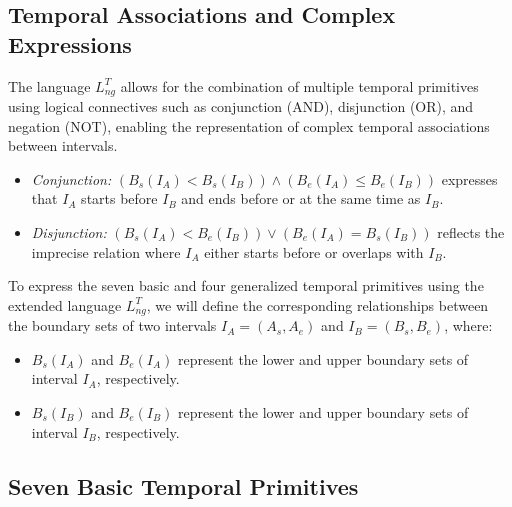 \subsection{Temporal Associations and Complex Expressions}\label{V-subsec:temporalassociations}

The language \( L_{ng}^T \) allows for the combination of multiple temporal primitives using logical connectives such as conjunction (AND), disjunction (OR), and negation (NOT), enabling the representation of complex temporal associations between intervals.

\begin{itemize}
    \item \textit{Conjunction:} \( (B_s(I_A) < B_s(I_B)) \land (B_e(I_A) \leq B_e(I_B)) \) expresses that \( I_A \) starts before \( I_B \) and ends before or at the same time as \( I_B \).
    \item \textit{Disjunction:} \( (B_s(I_A) < B_e(I_B)) \lor (B_e(I_A) = B_s(I_B)) \) reflects the imprecise relation where \( I_A \) either starts before or overlaps with \( I_B \).
\end{itemize}

To express the seven basic and four generalized temporal primitives using the extended language \( L_{ng}^T \), we will define the corresponding relationships between the boundary sets of two intervals \( I_A = (A_s, A_e) \) and \( I_B = (B_s, B_e) \), where:

\begin{itemize}
    \item \( B_s(I_A) \) and \( B_e(I_A) \) represent the lower and upper boundary sets of interval \( I_A \), respectively.
    \item \( B_s(I_B) \) and \( B_e(I_B) \) represent the lower and upper boundary sets of interval \( I_B \), respectively.
\end{itemize}

\subsection{Seven Basic Temporal Primitives}\label{V-subsec:sevenTemporalPrimitives}

